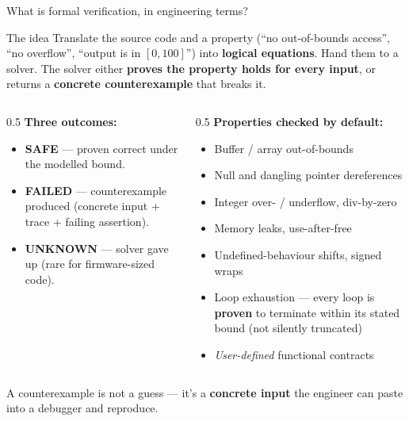\documentclass[aspectratio=169,11pt]{beamer}
\newcommand{\hil}[1]{\textbf{\textcolor{nvgreendark}{#1}}}
\begin{document}
\begin{frame}{What is formal verification, in engineering terms?}
  \begin{block}{The idea}
    \small
    Translate the source code and a property (``no out-of-bounds access'',
    ``no overflow'', ``output is in $[0, 100]$'') into \hil{logical equations}.
    Hand them to a solver. The solver either \hil{proves the property holds
    for every input}, or returns a \hil{concrete counterexample} that breaks it.
  \end{block}

  \vspace{0.2em}
  \begin{columns}[T,onlytextwidth]
    \begin{column}{0.5\textwidth}
      \footnotesize
      \textbf{Three outcomes:}
      \begin{itemize}\setlength\itemsep{0.15em}
        \item \textcolor{nvgreendark}{\bfseries SAFE} — proven correct under
              the modelled bound.
        \item \textcolor{nvred}{\bfseries FAILED} — counterexample produced
              (concrete input + trace + failing assertion).
        \item \textcolor{nvgray}{\bfseries UNKNOWN} — solver gave up
              (rare for firmware-sized code).
      \end{itemize}
    \end{column}
    \begin{column}{0.5\textwidth}
      \footnotesize
      \textbf{Properties checked by default:}
      \begin{itemize}\setlength\itemsep{0.1em}
        \item Buffer / array out-of-bounds
        \item Null and dangling pointer dereferences
        \item Integer over- / underflow, div-by-zero
        \item Memory leaks, use-after-free
        \item Undefined-behaviour shifts, signed wraps
        \item Loop exhaustion — every loop is \hil{proven} to
              terminate within its stated bound (not silently truncated)
        \item \emph{User-defined} functional contracts
      \end{itemize}
    \end{column}
  \end{columns}

  \vspace{0.3em}
  {\scriptsize A counterexample is not a guess — it's a \hil{concrete input}
  the engineer can paste into a debugger and reproduce.}
\end{frame}
\end{document}
